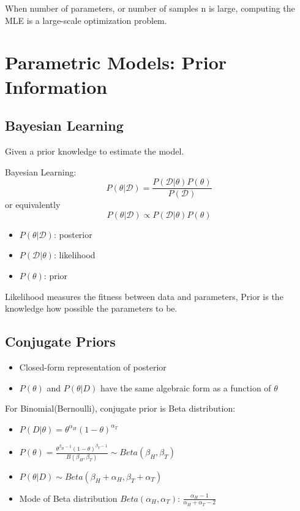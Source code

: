\documentclass[letterpaper, 10pt, twocolumn]{article}
\begin{document}
When number of parameters, or number of samples n is large, computing the MLE is a large-scale optimization problem.

\newpage

\section{Parametric Models: Prior Information}

\subsection{Bayesian Learning}

Given a prior knowledge to estimate the model.

Bayesian Learning:
$$P(\theta|\mathcal{D}) = \frac{P(\mathcal{D}|\theta)P(\theta)}{P(\mathcal{D})}$$
or equivalently
$$P(\theta|\mathcal{D}) \propto P(\mathcal{D}|\theta)P(\theta)$$
\begin{itemize}
	\item $P(\theta|\mathcal{D})$: posterior
	\item $P(\mathcal{D}|\theta)$: likelihood
	\item $P(\theta)$: prior
\end{itemize}
Likelihood measures the fitness between data and parameters, Prior is the knowledge how possible the parameters to be.

\subsection{Conjugate Priors}

\begin{itemize}
	\item Closed-form representation of posterior
	\item $P(\theta)$ and $P(\theta|D)$ have the same algebraic form as a function of $\theta$
\end{itemize}

For Binomial(Bernoulli), conjugate prior is Beta distribution:
\begin{itemize}
	\item $P(D|\theta) = \theta^{\alpha_H}(1-\theta)^{\alpha_T}$
	\item $P(\theta) = \frac{\theta^{\beta_H-1}(1-\theta)^{\beta_T-1}}{B(\beta_H,\beta_T)} \sim Beta(\beta_H,\beta_T)$
	\item $P(\theta|D) \sim Beta(\beta_H+\alpha_H,\beta_T+\alpha_T)$
	\item Mode of Beta distribution $Beta(\alpha_H,\alpha_T)$: $\frac{\alpha_H-1}{\alpha_H+\alpha_T-2}$
\end{itemize}
\end{document}
